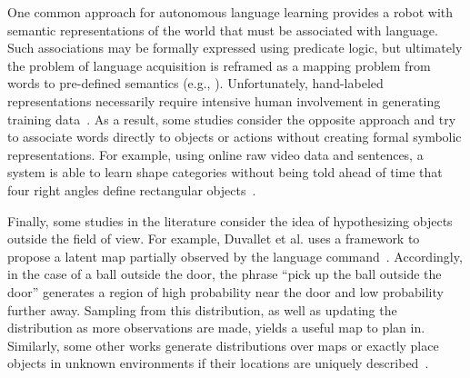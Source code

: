 One common approach for autonomous language learning provides a robot with semantic representations of the world that must be associated with language.
Such associations may be formally expressed using predicate logic, but ultimately the problem of language acquisition is reframed as a mapping problem from words to pre-defined semantics (e.g., \cite{langlearn1,langlearn2,formal1,formal2}).
Unfortunately, hand-labeled representations necessarily require intensive human involvement in generating training data~\cite{mooneypivot}.
As a result, some studies consider the opposite approach and try to associate words directly to objects or actions without creating formal symbolic representations.
For example, using online raw video data and sentences, a system is able to learn shape categories without being told ahead of time that four right angles define rectangular objects~\cite{langlearn3,langlearn4}.

Finally, some studies in the literature consider the idea of hypothesizing objects outside the field of view. For example, Duvallet et al. uses a framework to propose a latent map partially observed by the language command~\cite{citeLangNoisySensor}.
Accordingly, in the case of a ball outside the door, the phrase ``pick up the ball outside the door'' generates a region of high probability near the door and low probability further away.
Sampling from this distribution, as well as updating the distribution as more observations are made, yields a useful map to plan in.
Similarly, some other works generate distributions over maps or exactly place objects in unknown environments if their locations are uniquely described~\cite{learningSemanticMaps,outside1}.